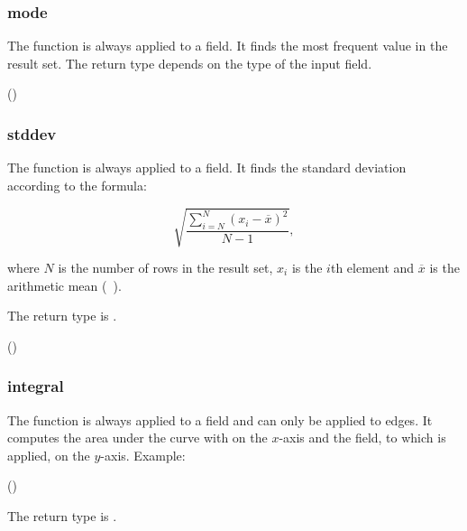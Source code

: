 
\subsubsection{mode}
The function is always applied to a field.
It finds the most frequent value in the result set.
The return type depends on the type of the input field.

 ()
 


\subsubsection{stddev}
The function is always applied to a field.
It finds the standard deviation according to the formula:

\[
\sqrt{\frac{\sum_{i=N}^{N}{(x_i - \overline{x})^2}}{N-1}},
\]

where $N$ is the number of rows in the result set,
$x_i$ is the $i$th element and $\overline{x}$ is
the arithmetic mean (\ie\ ).

The return type is .

 ()
 


\subsubsection{integral}
The function is always applied to a field and
can only be applied to edges.
It computes the area under the curve with
 on the $x$-axis and the field,
to which  is applied,
on the $y$-axis. Example:

 ()
 

The return type is .


